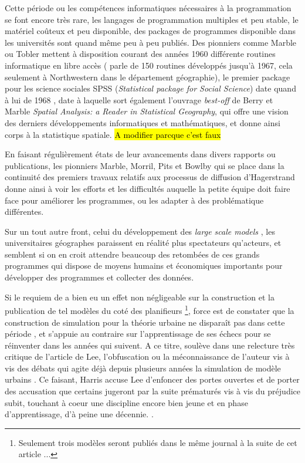 Cette période ou les compétences informatiques nécessaires à la programmation se font encore très rare, les langages de programmation multiples et peu stable, le matériel coûteux et peu disponible, des packages de programmes disponible dans les universités sont quand même peu à peu publiés. Des pionniers comme Marble ou Tobler mettent à disposition courant des années 1960 différente routines informatique en libre accès \autocite{Haggett1969}  (\textcite[3]{Marble1967} parle de 150 routines développés jusqu'à 1967, cela seulement à Northwestern dans le département géographie), le premier package pour les science sociales SPSS (\textit{Statistical package for Social Science}) date quand à lui de 1968 \autocite{Barnes2011}, date à laquelle sort également l'ouvrage \textit{best-off} de Berry et Marble \textit{Spatial Analysis: a Reader in Statistical Geography}, qui offre une vision des derniers développements informatiques et mathématiques, et donne ainsi corps à la statistique spatiale. \hl{A modifier parcque c'est faux}

En faisant régulièrement états de leur avancements dans divers rapports ou publications, les pionniers Marble, Morril, Pits et Bowlby \autocite{Pitts1963} qui se place dans la continuité des premiers travaux relatifs aux processus de diffusion d'Hagerstrand \autocite{Hagerstrand1953, Hagerstrand1967a} donne ainsi à voir les efforts et les difficultés auquelle la petite équipe doit faire face pour améliorer les programmes, ou les adapter à des problématique différentes.

Sur un tout autre front, celui du développement des \textit{large scale models} \autocite[8]{Batty1976} \autocite[11]{Batty1994}, les universitaires géographes paraissent en réalité plus spectateurs qu'acteurs, et semblent si on en croit \textcite{Haggett1969} attendre beaucoup des retombées de ces grands programmes qui dispose de moyens humains et économiques importants pour développer des programmes et collecter des données.

Si le requiem de \textcite{Lee1973} a bien eu un effet non négligeable sur la construction et la publication de tel modèles du coté des planifieurs \footnote{Seulement trois modèles seront publiés dans le même journal à la suite de cet article ...}, force est de constater que la construction de simulation pour la théorie urbaine ne disparaît pas dans cette période \autocite[11-12]{Batty1994}, et s'appuie au contraire sur l'apprentissage de ses échecs pour se réinventer dans les années qui suivent. A ce titre, \textcite{Harris1994} soulève dans une relecture très critique de l'article de Lee, l'obfuscation ou la méconnaissance de l'auteur vis à vis des débats qui agite déjà depuis plusieurs années la simulation de modèle urbains \autocite{Wilson1970, Orcutt1957, Harris1968}. Ce faisant, Harris accuse Lee d'enfoncer des portes ouvertes et de porter des accusation que certains jugeront par la suite prématurés vis à vis du préjudice subit, touchant à coeur une discipline encore bien jeune et en phase d'apprentissage, d'à peine une décennie. \autocite[p11]{Batty1994}.

